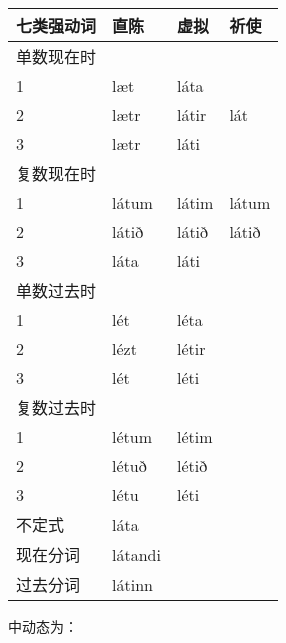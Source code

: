 \begin{longtable}{llll}
  \toprule
  七类强动词 & 直陈      & 虚拟    & 祈使    \\
  \midrule
  \endhead
  \bottomrule
  \endfoot
  单数现在时 &         &       &       \\
  1     & læt     & láta  &       \\
  2     & lætr    & látir & lát   \\
  3     & lætr    & láti  &       \\
  复数现在时 &         &       &       \\
  1     & látum   & látim & látum \\
  2     & látið   & látið & látið \\
  3     & láta    & láti  &       \\
  单数过去时 &         &       &       \\
  1     & lét     & léta  &       \\
  2     & lézt    & létir &       \\
  3     & lét     & léti  &       \\
  复数过去时 &         &       &       \\
  1     & létum   & létim &       \\
  2     & létuð   & létið &       \\
  3     & létu    & léti  &       \\
  不定式   & láta    &       &       \\
  现在分词  & látandi &       &       \\
  过去分词  & látinn  &       &       \\
\end{longtable}

中动态为：

